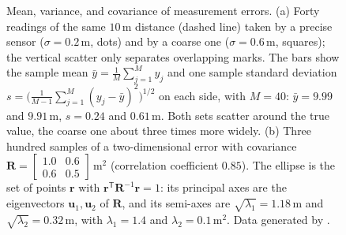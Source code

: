 \begin{figure}[!t]
{}
\caption{Mean, variance, and covariance of measurement errors. (a) Forty readings of the same $10$\,m distance (dashed line) taken by a precise sensor ($\sigma=0.2$\,m, dots) and by a coarse one ($\sigma=0.6$\,m, squares); the vertical scatter only separates overlapping marks. The bars show the sample mean $\bar y=\frac{1}{M}\sum_{j=1}^{M}y_j$ and one sample standard deviation $s=\big(\frac{1}{M-1}\sum_{j=1}^{M}(y_j-\bar y)^2\big)^{1/2}$ on each side, with $M=40$: $\bar y=9.99$ and $9.91$\,m, $s=0.24$ and $0.61$\,m. Both sets scatter around the true value, the coarse one about three times more widely. (b) Three hundred samples of a two-dimensional error with covariance $\mathbf{R}=\left[\begin{smallmatrix}1.0&0.6\\0.6&0.5\end{smallmatrix}\right]$\,m$^2$ (correlation coefficient $0.85$). The ellipse is the set of points $\mathbf{r}$ with $\mathbf{r}^{\mathsf T}\mathbf{R}^{-1}\mathbf{r}=1$: its principal axes are the eigenvectors $\mathbf{u}_1,\mathbf{u}_2$ of $\mathbf{R}$, and its semi-axes are $\sqrt{\lambda_1}=1.18$\,m and $\sqrt{\lambda_2}=0.32$\,m, with $\lambda_1=1.4$ and $\lambda_2=0.1$\,m$^2$. Data generated by .}
\label{fig:mean-variance}
\end{figure}



